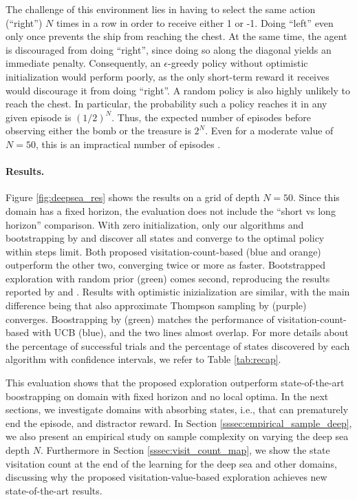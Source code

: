 \documentclass{article}
\begin{document}
The challenge of this environment lies in having to select the same action (``right'') $N$ times in a row in order to receive either 1 or -1. Doing ``left'' even only once prevents the ship from reaching the chest. At the same time, the agent is discouraged from doing ``right'', since doing so along the diagonal yields an immediate penalty. 
Consequently, an $\epsilon$-greedy policy without optimistic initialization would perform poorly, as the only short-term reward it receives would discourage it from doing ``right''. A random policy is also highly unlikely to reach the chest. In particular, the probability such a policy reaches it in any given episode is $(1/2)^N$. Thus, the expected number of episodes before observing either the bomb or the treasure is $2^N$. Even for a moderate value of $N = 50$, this is an impractical number of episodes \citep{osband2019deep}.



\paragraph{Results.}
Figure \ref{fig:deepsea_res} shows the results on a grid of depth $N = 50$. Since this domain has a fixed horizon, the evaluation does not include the ``short vs long horizon'' comparison.
With zero initialization, only our algorithms and bootstrapping by \citet{osband2016deep} and \citet{osband2019deep} discover all states and converge to the optimal policy within steps limit. Both proposed visitation-count-based (blue and orange) outperform the other two, converging twice or more as faster. Bootstrapped exploration with random prior (green) comes second, reproducing the results reported by \citet{osband2018randomized} and \citet{osband2019deep}.
Results with optimistic inizialization are similar, with the main difference being that also approximate Thompson sampling by \citet{deramo2019exploiting} (purple) converges. Boostrapping by \citet{osband2018randomized} (green) matches the performance of visitation-count-based with UCB (blue), and the two lines almost overlap.
For more details about the percentage of successful trials and the percentage of states discovered by each algorithm with confidence intervals, we refer to Table \ref{tab:recap}.

This evaluation shows that the proposed exploration outperform state-of-the-art boostrapping on domain with fixed horizon and no local optima. In the next sections, we investigate domains with absorbing states, i.e., that can prematurely end the episode, and distractor reward.
In Section \ref{sssec:empirical_sample_deep}, we also present an empirical study on sample complexity on varying the deep sea depth $N$. Furthermore in Section \ref{sssec:visit_count_map}, we show the state visitation count at the end of the learning for the deep sea and other domains, discussing why the proposed visitation-value-based exploration achieves new state-of-the-art results.
\end{document}
